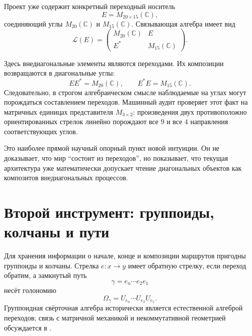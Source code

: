 Проект уже содержит конкретный переходный носитель
\begin{equation}
 E=M_{20\times15}(\mathbb C),
\end{equation}
соединяющий углы $M_{20}(\mathbb C)$ и $M_{15}(\mathbb C)$. Связывающая
алгебра имеет вид
\begin{equation}
 \mathcal L(E)=
 \begin{pmatrix}
 M_{20}(\mathbb C)&E\\
 E^*&M_{15}(\mathbb C)
 \end{pmatrix}.
 \label{eq:v5-transition-linking-algebra}
\end{equation}

Здесь внедиагональные элементы являются переходами. Их композиции
возвращаются в диагональные углы:
\begin{equation}
 EE^*=M_{20}(\mathbb C),
 \qquad
 E^*E=M_{15}(\mathbb C).
 \label{eq:v5-transitions-generate-corners}
\end{equation}
Следовательно, в строгом алгебраическом смысле наблюдаемые на углах могут
порождаться составлением переходов. Машинный аудит проверяет этот факт на
матричных единицах представителя $M_{3\times2}$: произведения двух
противоположно ориентированных стрелок линейно порождают все $9$ и все $4$
направления соответствующих углов.

Это наиболее прямой научный опорный пункт новой интуиции. Он не доказывает,
что мир ``состоит из переходов'', но показывает, что текущая архитектура
уже математически допускает чтение диагональных объектов как композитов
внедиагональных процессов.

\section{Второй инструмент: группоиды, колчаны и пути}

Для хранения информации о начале, конце и композиции маршрутов пригодны
группоиды и колчаны. Стрелка $e:x\to y$ имеет обратную стрелку, если
переход обратим, а замкнутый путь
\begin{equation}
 \gamma=e_n\cdots e_2e_1
\end{equation}
несёт голономию
\begin{equation}
 \Omega_\gamma=U_{e_n}\cdots U_{e_2}U_{e_1}.
 \label{eq:v5-transition-holonomy}
\end{equation}
Группоидная свёрточная алгебра исторически является естественной алгеброй
переходов; связь с матричной механикой и некоммутативной геометрией
обсуждается в .

